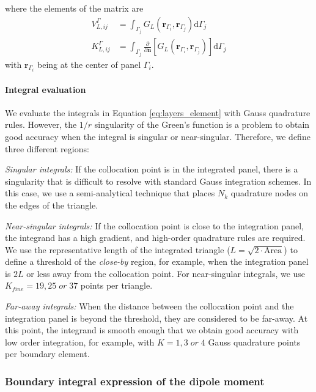%
\noindent where the elements of the matrix are
%
\begin{align} \label{eq:layers_element}
V_{L,ij}^{\Gamma} &= \int_{\Gamma_j} G_L(\mathbf{r}_{\Gamma_i},\mathbf{r}_{\Gamma_j})  \mathrm{d} \Gamma_j \nonumber \\
K_{L,ij}^{\Gamma} &= \int_{\Gamma_j} \frac{\partial}{\partial \mathbf{n}} \left[ G_L(\mathbf{r}_{\Gamma_i},\mathbf{r}_{\Gamma_j}) \right]\mathrm{d} \Gamma_j
\end{align}
%
\noindent with $\mathbf{r}_{\Gamma_i}$ being at the center of panel $\Gamma_i$.


\paragraph{Integral evaluation}

We evaluate the integrals in Equation \eqref{eq:layers_element} with Gauss quadrature
rules. However, the $1/r$ singularity of the Green's function is a
problem to obtain good accuracy when the integral is 
singular or near-singular. Therefore, we define three different regions:

\emph{Singular integrals:} If the collocation point is in the integrated panel,
there is a singularity that is difficult to resolve with standard
Gauss integration schemes. In this case, we use a semi-analytical technique 
\cite{HessSmith1967,ZhuHuangSongWhite2001} that places $N_k$ quadrature nodes on the 
edges of the triangle.

\emph{Near-singular integrals:} If the collocation point is close to the integration panel,
the integrand has a high gradient, and high-order quadrature rules are required. 
We use the representative length of the integrated triangle ($L = \sqrt{2\cdot\text{Area}}$)
to define a threshold of the \emph{close-by} region, for example, when the integration panel 
is $2L$ or less away from the collocation point. For near-singular integrals, we use 
$K_{fine}=19, 25 \; or \; 37$ points per triangle. 

\emph{Far-away integrals:} When the distance between the collocation point and the integration
panel is beyond the threshold, they are considered to be far-away. 
At this point, the integrand is smooth enough that we obtain good 
accuracy with low order integration, for example, with 
$K=1, 3 \; or \; 4$ Gauss quadrature points per boundary element. 

\subsubsection{Boundary integral expression of the dipole moment}

